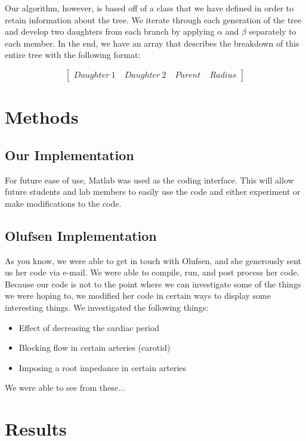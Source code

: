 \documentclass[12pt]{article}
\begin{document}
Our algorithm, however, is based off of a class that we have defined in order to retain information about the tree. We iterate through each generation of the tree and develop two daughters from each branch by applying $\alpha$ and $\beta$ separately to each member. In the end, we have an array that describes the breakdown of this entire tree with the following format:

\begin{equation}
	\begin{bmatrix}
		Daughter \: 1 \; & Daughter \: 2 \; & Parent \; & Radius 
	\end{bmatrix}
\end{equation}

\section{Methods}
\subsection{Our Implementation}
For future ease of use, Matlab was used as the coding interface. This will allow future students and lab members to easily use the code and either experiment or make modifications to the code. 

\subsection{Olufsen Implementation}
As you know, we were able to get in touch with Olufsen, and she generously sent us her code via e-mail. We were able to compile, run, and post process her code. Because our code is not to the point where we can investigate some of the things we were hoping to, we modified her code in certain ways to display some interesting things. We investigated the following things:

\begin{itemize}
	\item
		Effect of decreasing the cardiac period
	\item
		Blocking flow in certain arteries (carotid)
	\item
		Imposing a root impedance in certain arteries
\end{itemize}

We were able to see from these...

\section{Results}
\end{document}
